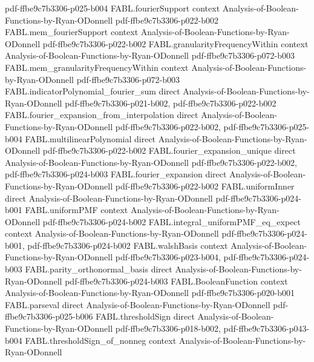 \begin{theorem}
  {pdf-ffbe9c7b3306-p025-b004}
\proofstep
  {FABL.fourierSupport}
  {context}
  {Analysis-of-Boolean-Functions-by-Ryan-ODonnell}
  {pdf-ffbe9c7b3306-p022-b002}
\proofstep
  {FABL.mem_fourierSupport}
  {context}
  {Analysis-of-Boolean-Functions-by-Ryan-ODonnell}
  {pdf-ffbe9c7b3306-p022-b002}
\proofstep
  {FABL.granularityFrequencyWithin}
  {context}
  {Analysis-of-Boolean-Functions-by-Ryan-ODonnell}
  {pdf-ffbe9c7b3306-p072-b003}
\proofstep
  {FABL.mem_granularityFrequencyWithin}
  {context}
  {Analysis-of-Boolean-Functions-by-Ryan-ODonnell}
  {pdf-ffbe9c7b3306-p072-b003}
\proofstep
  {FABL.indicatorPolynomial_fourier_sum}
  {direct}
  {Analysis-of-Boolean-Functions-by-Ryan-ODonnell}
  {pdf-ffbe9c7b3306-p021-b002,
    pdf-ffbe9c7b3306-p022-b002}
\proofstep
  {FABL.fourier_expansion_from_interpolation}
  {direct}
  {Analysis-of-Boolean-Functions-by-Ryan-ODonnell}
  {pdf-ffbe9c7b3306-p022-b002,
    pdf-ffbe9c7b3306-p025-b004}
\proofstep
  {FABL.multilinearPolynomial}
  {direct}
  {Analysis-of-Boolean-Functions-by-Ryan-ODonnell}
  {pdf-ffbe9c7b3306-p022-b002}
\proofstep
  {FABL.fourier_expansion_unique}
  {direct}
  {Analysis-of-Boolean-Functions-by-Ryan-ODonnell}
  {pdf-ffbe9c7b3306-p022-b002,
    pdf-ffbe9c7b3306-p024-b003}
\proofstep
  {FABL.fourier_expansion}
  {direct}
  {Analysis-of-Boolean-Functions-by-Ryan-ODonnell}
  {pdf-ffbe9c7b3306-p022-b002}
\proofstep
  {FABL.uniformInner}
  {direct}
  {Analysis-of-Boolean-Functions-by-Ryan-ODonnell}
  {pdf-ffbe9c7b3306-p024-b001}
\proofstep
  {FABL.uniformPMF}
  {context}
  {Analysis-of-Boolean-Functions-by-Ryan-ODonnell}
  {pdf-ffbe9c7b3306-p024-b002}
\proofstep
  {FABL.integral_uniformPMF_eq_expect}
  {context}
  {Analysis-of-Boolean-Functions-by-Ryan-ODonnell}
  {pdf-ffbe9c7b3306-p024-b001,
    pdf-ffbe9c7b3306-p024-b002}
\proofstep
  {FABL.walshBasis}
  {context}
  {Analysis-of-Boolean-Functions-by-Ryan-ODonnell}
  {pdf-ffbe9c7b3306-p023-b004,
    pdf-ffbe9c7b3306-p024-b003}
\proofstep
  {FABL.parity_orthonormal_basis}
  {direct}
  {Analysis-of-Boolean-Functions-by-Ryan-ODonnell}
  {pdf-ffbe9c7b3306-p024-b003}
\proofstep
  {FABL.BooleanFunction}
  {context}
  {Analysis-of-Boolean-Functions-by-Ryan-ODonnell}
  {pdf-ffbe9c7b3306-p020-b001}
\proofstep
  {FABL.parseval}
  {direct}
  {Analysis-of-Boolean-Functions-by-Ryan-ODonnell}
  {pdf-ffbe9c7b3306-p025-b006}
\proofstep
  {FABL.thresholdSign}
  {direct}
  {Analysis-of-Boolean-Functions-by-Ryan-ODonnell}
  {pdf-ffbe9c7b3306-p018-b002,
    pdf-ffbe9c7b3306-p043-b004}
\proofstep
  {FABL.thresholdSign_of_nonneg}
  {context}
  {Analysis-of-Boolean-Functions-by-Ryan-ODonnell}

\end{theorem}
